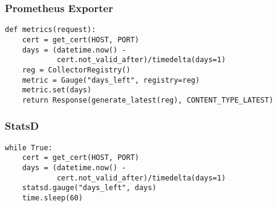 
\begin{frame}
\frametitle{Prometheus Exporter}

\begin{lstlisting}
def metrics(request):
    cert = get_cert(HOST, PORT)
    days = (datetime.now() -
            cert.not_valid_after)/timedelta(days=1)
    reg = CollectorRegistry()
    metric = Gauge("days_left", registry=reg)
    metric.set(days)
    return Response(generate_latest(reg), CONTENT_TYPE_LATEST)
\end{lstlisting}
\end{frame}

\begin{frame}
\frametitle{StatsD}

\begin{lstlisting}
while True:
    cert = get_cert(HOST, PORT)
    days = (datetime.now() -
            cert.not_valid_after)/timedelta(days=1)
    statsd.gauge("days_left", days)
    time.sleep(60)
\end{lstlisting}
\end{frame}



